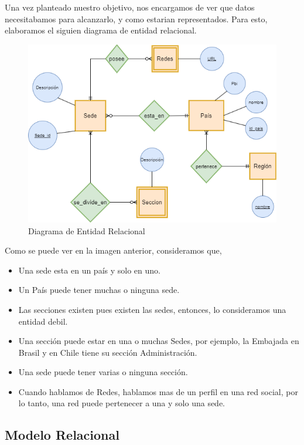 \documentclass[10pt,a4paper]{article}
\begin{document}
Una vez planteado nuestro objetivo, nos encargamos de ver que datos necesitabamos para alcanzarlo, y como estarian representados. Para esto, elaboramos el siguien diagrama de entidad
relacional.  \vspace{0.2cm}

\begin{figure}[ht]
	\centering
	\includegraphics[width=1\textwidth]{DerFinal.png}
	\caption{Diagrama de Entidad Relacional}
	\label{fig:ejemplo}
\end{figure} \vspace{0.1cm}

Como se puede ver en la imagen anterior, consideramos que,

\begin{itemize}
	\item Una sede esta en un país y solo en uno.
	\item Un País puede tener muchas o ninguna sede.
	\item Las secciones existen pues existen las sedes, entonces, lo consideramos una entidad debil.
	\item Una sección puede estar en una o muchas Sedes, por ejemplo, la Embajada en Brasil y en Chile tiene su sección Administración.
	\item Una sede puede tener varias o ninguna sección.
	\item Cuando hablamos de Redes, hablamos mas de un perfil en una red social, por lo tanto, una red puede pertenecer a una y solo una sede.
\end{itemize}


\subsection{Modelo Relacional} \vspace{0.2cm}
\end{document}
